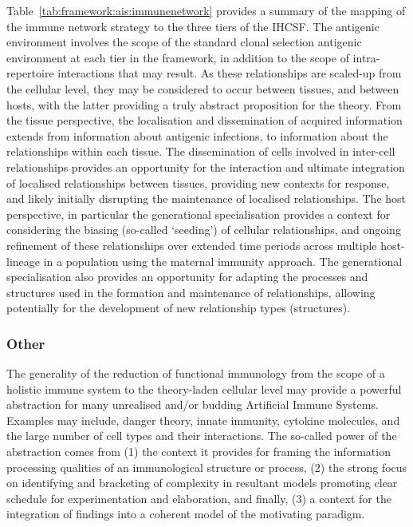 Table~\ref{tab:framework:ais:immunenetwork} provides a summary of the mapping of the immune network strategy to the three tiers of the IHCSF. 
The antigenic environment involves the scope of the standard clonal selection antigenic environment at each tier in the framework, in addition to the scope of intra-repertoire interactions that may result. As these relationships are scaled-up from the cellular level, they may be considered to occur between tissues, and between hosts, with the latter providing a truly abstract proposition for the theory. 
From the tissue perspective, the localisation and dissemination of acquired information extends from information about antigenic infections, to information about the relationships within each tissue. The dissemination of cells involved in inter-cell relationships provides an opportunity for the interaction and ultimate integration of localised relationships between tissues, providing new contexts for response, and likely initially disrupting the maintenance of localised relationships. 
The host perspective, in particular the generational specialisation provides a context for considering the biasing (so-called `seeding') of cellular relationships, and ongoing refinement of these relationships over extended time periods across multiple host-lineage in a population using the maternal immunity approach. The generational specialisation also provides an opportunity for adapting the processes and structures used in the formation and maintenance of relationships, allowing potentially for the development of new relationship types (structures).

%
%
\subsubsection{Other}
The generality of the reduction of functional immunology from the scope of a holistic immune system to the theory-laden cellular level may provide a powerful abstraction for many unrealised and/or budding Artificial Immune Systems. Examples may include, danger theory, innate immunity, cytokine molecules, and the large number of cell types and their interactions. The so-called power of the abstraction comes from (1) the context it provides for framing the information processing qualities of an immunological structure or process, (2) the strong focus on identifying and bracketing of complexity in resultant models promoting clear schedule for experimentation and elaboration, and finally, (3) a context for the integration of findings into a coherent model of the motivating paradigm. 

